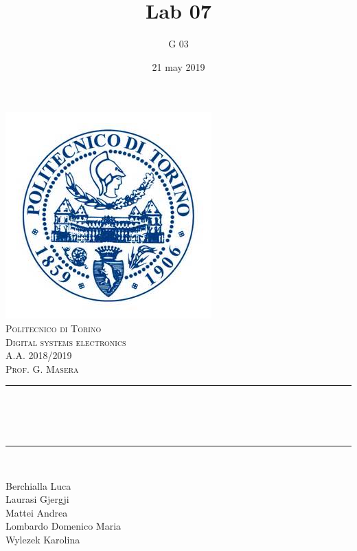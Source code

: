 \documentclass[12pt]{article}
\title{Lab 07}													%
\author{G 03}														%
\date{21 may 2019}														%
\makeatletter
\let\thetitle\@title
\let\thedate\@date
\makeatother
\begin{document}

\begin{titlepage}
	\centering
    \vspace*{0.5 cm}
    \includegraphics[scale = 0.75]{polito.jpg}\\[1.0 cm]				%
    \textsc{\LARGE Politecnico di Torino}\\[2.0 cm]						%
	\textsc{\Large Digital systems electronics\\ A.A. 2018/2019}\\[0.5 cm]		%
	\textsc{\Large Prof. G. Masera}\\[0.5 cm]		%
	\rule{\linewidth}{0.2 mm} \\[0.4 cm]
	{ \huge \bfseries \thetitle \\ \small \thedate}\\
	\rule{\linewidth}{0.2 mm} \\[1.5 cm]
	
	\begin{minipage}{0.4\textwidth}
		\begin{flushleft} \large
			Berchialla Luca\\												%
			Laurasi Gjergji
			\\
			
			Mattei Andrea\\
            Lombardo Domenico Maria\\
            Wylezek Karolina
            
			\end{flushleft}
			\end{minipage}~
			\begin{minipage}{0.4\textwidth}
            

\end{minipage}
\end{titlepage}
\end{document}
